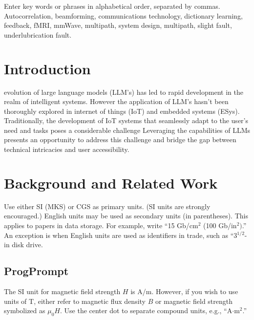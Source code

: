 \documentclass{ieeeaccess}
\begin{document}
\begin{keywords}
Enter key words or phrases in alphabetical
order, separated by commas. Autocorrelation, beamforming, communications technology, dictionary learning, feedback, fMRI, mmWave, multipath, system design, multipath, slight fault, underlubrication fault.
\end{keywords}

\titlepgskip=-21pt

\maketitle

\section{Introduction}
\label{sec:introduction}
 evolution of large language models (LLM's) has led to rapid development in the  realm of intelligent systems. However the application of LLM's hasn't been thoroughly explored in internet of things (IoT) and embedded systems (ESys). Traditionally, the development of IoT systems that seamlessly adapt to the user's need and tasks poses a considerable challenge Leveraging the capabilities of LLMs presents an opportunity to address this challenge and bridge the gap between technical intricacies and user accessibility. 
\section{Background and Related Work}
Use either SI (MKS) or CGS as primary units. (SI units are strongly
encouraged.) English units may be used as secondary units (in parentheses).
This applies to papers in data storage. For example, write ``15
Gb/cm$^{2}$ (100 Gb/in$^{2})$.'' An exception is when
English units are used as identifiers in trade, such as ``3$^{1\!/\!2}$-in
disk drive.

\subsection{ProgPrompt}
The SI unit for magnetic field strength $H$ is A/m. However, if you wish to use
units of T, either refer to magnetic flux density $B$ or magnetic field
strength symbolized as $\mu _{0}H$. Use the center dot to separate
compound units, e.g., ``A$\cdot $m$^{2}$.''


\end{document}

